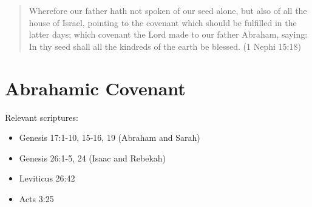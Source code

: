 \begin{quotation}
Wherefore our father hath not spoken of our seed alone, but also of all the house of Israel, pointing to the covenant which should be fulfilled in the latter days; which covenant the Lord made to our father Abraham, saying: In thy seed shall all the kindreds of the earth be blessed. (1 Nephi 15:18)
\end{quotation}

\section{Abrahamic Covenant}
Relevant scriptures:
\begin{itemize}
  \item Genesis 17:1-10, 15-16, 19 (Abraham and Sarah)
  \item Genesis 26:1-5, 24 (Isaac and Rebekah)
  \item Leviticus 26:42
  \item Acts 3:25
\end{itemize}

